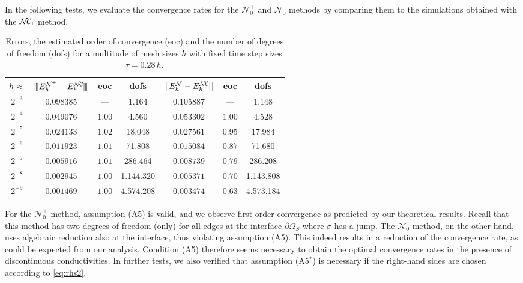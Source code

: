 \documentclass[12pt,reqno,a4paper]{amsart}
\theoremstyle{definition}
\def\NC{\mathcal{N\mkern-2mu C\mkern-2mu}}
\def\N{\mathcal{N}}
\newcommand{\tnorm}{{\vert\kern-0.25ex\vert\kern-0.25ex\vert}}
\begin{document}
In the following tests, we evaluate the convergence rates for the $\N_0^+$ and $\N_0$ methods by comparing them to the simulations obtained with the $\NC_1$ method. 
\begin{table}[ht!]
\centering
\begin{tabular}{c||c|c|c||c|c|c} 
$h\approx$ & $\tnorm E_h^{\N^+}-E_h^\NC\tnorm$ & eoc & dofs & $\tnorm E_h^{\N}-E_h^\NC \tnorm $  & eoc & dofs \\
\hline
\hline
\rule{0pt}{2.1ex}
$2^{-3}$ & $0.098385$ & ---    & 1.164     & $0.105887$ & ---    & 1.148 \\
$2^{-4}$ & $0.049076$ & $1.00$ & 4.560     & $0.053302$ & $1.00$ & 4.528 \\
$2^{-5}$ & $0.024133$ & $1.02$ & 18.048    & $0.027561$ & $0.95$ & 17.984 \\
$2^{-6}$ & $0.011923$ & $1.01$ & 71.808    & $0.015084$ & $0.87$ & 71.680 \\
$2^{-7}$ & $0.005916$ & $1.01$ & 286.464   & $0.008739$ & $0.79$ & 286.208 \\
$2^{-8}$ & $0.002945$ & $1.00$ & 1.144.320 & $0.005371$ & $0.70$ & 1.143.808 \\
$2^{-9}$ & $0.001469$ & $1.00$ & 4.574.208 & $0.003474$ & $0.63$ & 4.573.184
\end{tabular}
\medskip
\caption{Errors, the estimated order of convergence (eoc) and the number of degrees of freedom (dofs) for a multitude of mesh sizes $h$ with fixed time step sizes $\tau = 0.28\,h$.\label{tab:tab2}} 
\end{table}
For the $\N_0^+$-method, assumption (A5) is valid, and we observe first-order convergence as predicted by our theoretical results. Recall that this method has two degrees of freedom (only) for all edges at the interface $\partial\Omega_S$ where $\sigma$ has a jump.
The $\N_0$-method, on the other hand, uses algebraic reduction also at the interface, thus violating assumption (A5). This indeed results in a reduction of the convergence rate, as could be expected from our analysis. 
Condition (A5) therefore seems necessary to obtain the optimal convergence rates in the presence of discontinuous conductivities.
In further tests, we also verified that 
assumption (A5$^*$) is necessary if the right-hand sides are chosen according to \eqref{eq:rhs2}.
\end{document}
